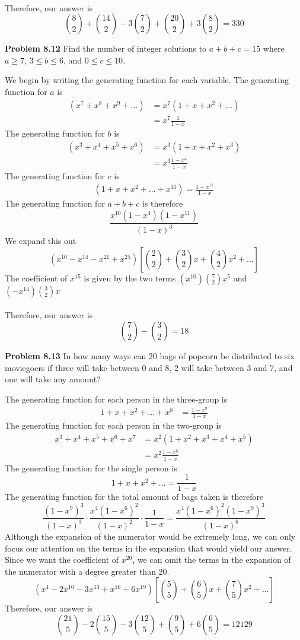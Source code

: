 \documentclass[11pt]{scrartcl}
\begin{document}
\\
\noindent 
Therefore, our answer is 
$${8 \choose 2}+{14 \choose 2}-3{7 \choose 2}+{20 \choose 2}+3{8 \choose 2}=330$$
\begin{tcolorbox}
\textbf{Problem 8.12} Find the number of integer solutions to $a+b+c=15$ where $a \ge 7$, $3 \leq b \leq 6$, and $0 \leq c \leq 10$. 
\end{tcolorbox}
\noindent
We begin by writing the generating function for each variable. The generating function for $a$ is 
\begin{align*}
    (x^7+x^8+x^9+...) &= x^7(1+x+x^2+...) \\
                      &=x^7\frac{1}{1-x}
\end{align*}
The generating function for $b$ is 
\begin{align*}
    (x^3+x^4+x^5+x^6) &=x^3(1+x+x^2+x^3) \\
                      &=x^3\frac{1-x^4}{1-x}
\end{align*}
The generating function for $c$ is 
\begin{align*}
    (1+x+x^2+...+x^{10})=\frac{1-x^{11}}{1-x}
\end{align*}
The generating function for $a+b+c$ is therefore 
$$\frac{x^{10}(1-x^4)(1-x^{11})}{(1-x)^3}$$
We expand this out 
$$(x^{10}-x^{14}-x^{21}+x^{25})\left[{2 \choose 2}+{3 \choose 2}x+{4 \choose 2}x^2+...\right]$$
The coefficient of $x^{15}$ is given by the two terms $(x^{10}){7 \choose 2}x^5$ and $(-x^{14}){3 \choose 2}x$\\
\\
\noindent 
Therefore, our answer is 
$${7 \choose 2}-{3 \choose 2}=18$$
\begin{tcolorbox}
\textbf{Problem 8.13} In how many ways can 20 bags of popcorn be distributed to six moviegoers if three will take between 0 and 8, 2 will take between 3 and 7, and one will take any amount?
\end{tcolorbox}
The generating function for each person in the three-group is 
\begin{align*}
    1+x+x^2+...+x^8 &= \frac{1-x^9}{1-x}
\end{align*}
The generating function for each person in the two-group is 
\begin{align*}
    x^3+x^4+x^5+x^6+x^7 &= x^2(1+x^2+x^3+x^4+x^5) \\
                        &= x^2\frac{1-x^6}{1-x}
\end{align*}
The generating function for the single person is
$$1+x+x^2+...=\frac{1}{1-x}$$
The generating function for the total amount of bags taken is therefore 
$$\frac{(1-x^9)^3}{(1-x)^3} \cdot \frac{x^4(1-x^6)^2}{(1-x)^2} \cdot \frac{1}{1-x}=\frac{x^4(1-x^6)^2(1-x^9)^3}{(1-x)^6}$$
Although the expansion of the numerator would be extremely long, we can only focus our attention on the terms in the expansion that would yield our answer. Since we want the coefficient of $x^20$, we can omit the terms in the expansion of the numerator with a degree greater than 20.
$$(x^4-2x^{10}-3x^{13}+x^{16}+6x^{19})\left[{5 \choose 5}+{6 \choose 5}x+{7 \choose 5}x^2+...\right]$$
Therefore, our answer is 
$${21 \choose 5}-2{15 \choose 5}-3{12 \choose 5}+{9 \choose 5}+6{6 \choose 5}=12129$$
\end{document}
